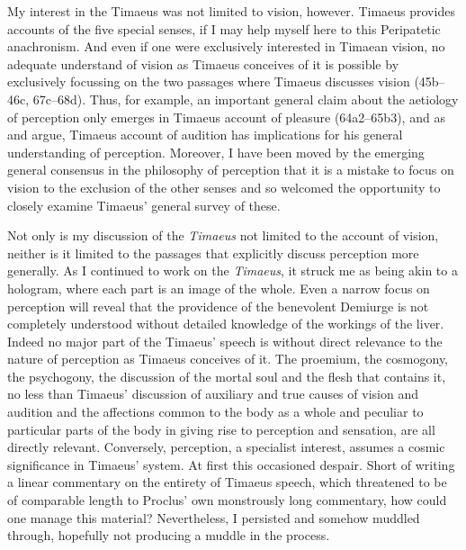 My interest in the Timaeus was not limited to vision, however. Timaeus provides accounts of the five special senses, if I may help myself here to this Peripatetic anachronism. And even if one were exclusively interested in Timaean vision, no adequate understand of vision as Timaeus conceives of it is possible by exclusively focussing on the two passages where Timaeus discusses vision (45b–46c, 67c–68d). Thus, for example, an important general claim about the aetiology of perception only emerges in Timaeus account of pleasure (64a2–65b3), and as \citet{Barker:2000dy} and \citet{Lautner:2005aa} argue, Timaeus account of audition has implications for his general understanding of perception. Moreover, I have been moved by the emerging general consensus in the philosophy of perception that it is a mistake to focus on vision to the exclusion of the other senses and so welcomed the opportunity to closely examine Timaeus' general survey of these.

Not only is my discussion of the \emph{Timaeus} not limited to the account of vision, neither is it limited to the passages that explicitly discuss perception more generally. As I continued to work on the \emph{Timaeus}, it struck me as being akin to a hologram, where each part is an image of the whole. Even a narrow focus on perception will reveal that the providence of the benevolent Demiurge is not completely understood without detailed knowledge of the workings of the liver. Indeed no major part of the Timaeus' speech is without direct relevance to the nature of perception as Timaeus conceives of it. The proemium, the cosmogony, the psychogony, the discussion of the mortal soul and the flesh that contains it, no less than Timaeus' discussion of auxiliary and true causes of vision and audition and the affections common to the body as a whole and peculiar to particular parts of the body in giving rise to perception and sensation, are all directly relevant. Conversely, perception, a specialist interest, assumes a cosmic significance in Timaeus' system. At first this occasioned despair. Short of writing a linear commentary on the entirety of Timaeus speech, which threatened to be of comparable length to Proclus' own monstrously long commentary, how could one manage this material? Nevertheless, I persisted and somehow muddled through, hopefully not producing a muddle in the process.

